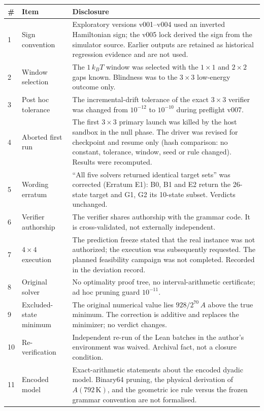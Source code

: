 \documentclass[11pt,a4paper]{article}
\theoremstyle{plain}
\theoremstyle{definition}
\theoremstyle{remark}
\newcommand{\kBT}{k_{B}T}
\begin{document}
\begin{center}\small
\begin{tabularx}{\linewidth}{@{}p{0.7cm}p{3.3cm}X@{}}
\toprule
\# & Item & Disclosure\\
\midrule
1 & Sign convention & Exploratory versions v001--v004 used an inverted Hamiltonian sign; the v005 lock derived the sign from the simulator source. Earlier outputs are retained as historical regression evidence and are not used.\\
2 & Window selection & The $1\,\kBT$ window was selected with the $1\times1$ and $2\times2$ gaps known. Blindness was to the $3\times3$ low-energy outcome only.\\
3 & Post hoc tolerance & The incremental-drift tolerance of the exact $3\times3$ verifier was changed from $10^{-12}$ to $10^{-10}$ during preflight v007.\\
4 & Aborted first run & The first $3\times3$ primary launch was killed by the host sandbox in the null phase. The driver was revised for checkpoint and resume only (hash comparison: no constant, tolerance, window, seed or rule changed). Results were recomputed.\\
5 & Wording erratum & ``All five solvers returned identical target sets'' was corrected (Erratum E1): B0, B1 and E2 return the 26-state target and G1, G2 its 10-state subset. Verdicts unchanged.\\
6 & Verifier authorship & The verifier shares authorship with the grammar code. It is cross-validated, not externally independent.\\
7 & $4\times4$ execution & The prediction freeze stated that the real instance was not authorized; the execution was subsequently requested. The planned feasibility campaign was not completed. Recorded in the deviation record.\\
8 & Original solver & No optimality proof tree, no interval-arithmetic certificate; ad hoc pruning guard $10^{-11}$.\\
9 & Excluded-state minimum & The original numerical value lies $928/2^{70}\,A$ above the true minimum. The correction is additive and replaces the minimizer; no verdict changes.\\
10 & Re-verification & Independent re-run of the Lean batches in the author's environment was waived. Archival fact, not a closure condition.\\
11 & Encoded model & Exact-arithmetic statements about the encoded dyadic model. Binary64 pruning, the physical derivation of $A(792\,\mathrm K)$, and the geometric ice rule versus the frozen grammar convention are not formalised.\\

\end{tabularx}
\end{center}
\end{document}
